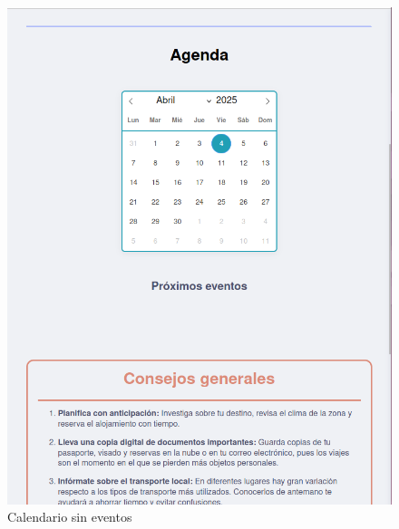 \documentclass[11pt, a4paper]{book}
\begin{document}
	\begin{figure} [H]
		\centering
		\includegraphics[height=0.4\textheight]{CSS/3 extra1.png}
		\caption{Calendario sin eventos}
	\end{figure}
\end{document}
